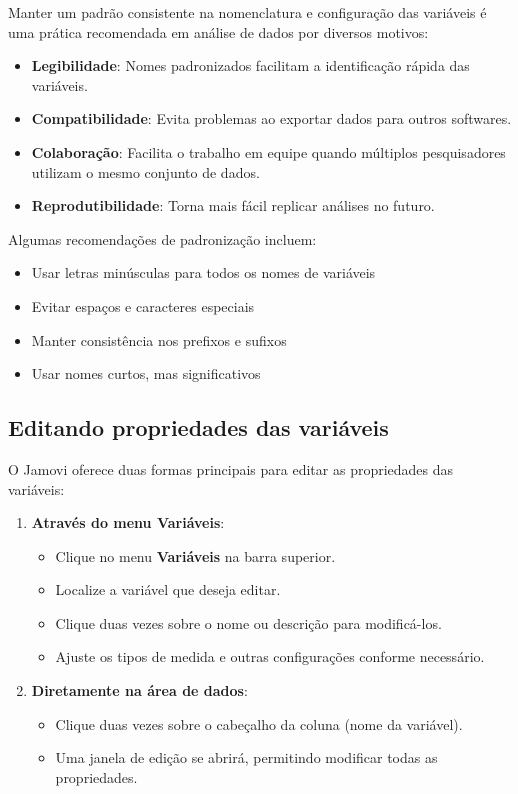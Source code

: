 Manter um padrão consistente na nomenclatura e configuração das variáveis é uma prática recomendada em análise de dados por diversos motivos:

\begin{itemize}
    \item \textbf{Legibilidade}: Nomes padronizados facilitam a identificação rápida das variáveis.
    \item \textbf{Compatibilidade}: Evita problemas ao exportar dados para outros softwares.
    \item \textbf{Colaboração}: Facilita o trabalho em equipe quando múltiplos pesquisadores utilizam o mesmo conjunto de dados.
    \item \textbf{Reprodutibilidade}: Torna mais fácil replicar análises no futuro.
\end{itemize}

Algumas recomendações de padronização incluem:
\begin{itemize}
    \item Usar letras minúsculas para todos os nomes de variáveis
    \item Evitar espaços e caracteres especiais
    \item Manter consistência nos prefixos e sufixos
    \item Usar nomes curtos, mas significativos
\end{itemize}

\subsection{Editando propriedades das variáveis}

O Jamovi oferece duas formas principais para editar as propriedades das variáveis:

\begin{enumerate}
    \item \textbf{Através do menu Variáveis}:
    \begin{itemize}
        \item Clique no menu \textbf{Variáveis} na barra superior.
        \item Localize a variável que deseja editar.
        \item Clique duas vezes sobre o nome ou descrição para modificá-los.
        \item Ajuste os tipos de medida e outras configurações conforme necessário.
    \end{itemize}
    
    \item \textbf{Diretamente na área de dados}:
    \begin{itemize}
        \item Clique duas vezes sobre o cabeçalho da coluna (nome da variável).
        \item Uma janela de edição se abrirá, permitindo modificar todas as propriedades.
    \end{itemize}
\end{enumerate}

